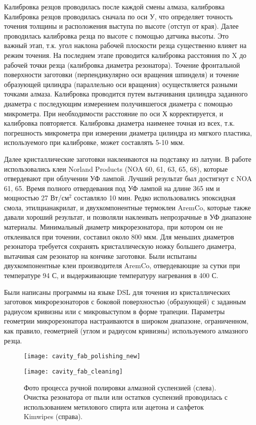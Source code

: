 Калибровка резцов проводилась после каждой смены алмаза, калибровка Калибровка резцов проводилась сначала по оси У, что определяет точность точения толщины и расположения выступа по высоте (отступ от края). Далее проводилась калибровка резца по высоте с помощью датчика высоты. Это важный этап, т.к. угол наклона рабочей плоскости резца существенно влияет на режим точения. На последнем этапе проводится калибровка расстояния по X до рабочей точки резца (калибровка диаметра резонатора). Точение фронтальной поверхности заготовки (перпендикулярно оси вращения шпинделя) и точение образующей цилиндра (параллельно оси вращения) осуществляется разными точками алмаза. Калибровка проводится путем вытачивания цилиндра заданного диаметра с последующим измерением получившегося диаметра с помощью микрометра. При необходимости расстояние по оси Х корректируется, и калибровка повторяется. Калибровка диаметра наименее точная из всех, т.к. погрешность микрометра при измерении диаметра цилиндра из мягкого пластика, используемого при калибровке, может составлять 5-10 мкм.

Далее кристаллические заготовки наклеиваются на подставку из латуни. В работе использовались клеи Norland Products (NOA 60, 61, 63, 65, 68), которые отвердевают при облучении УФ лампой. Лучший результат был достигнут с NOA 61, 65. Время полного отвердевания под УФ лампой на длине 365 нм и мощностью 27 Вт/см$^2$ составляло 10 мин. Редко использовались эпоксидная смола, этилцианакрилат, и двухкомпонентные термоклеи AremCo, которые также давали хороший результат, и позволяли наклеивать непрозрачные в УФ диапазоне материалы. Минимальный диаметр микрорезонатора, при котором он не отклеивался при точении, составил около 800 мкм. Для меньших диаметров резонатора требуется сохранять кристаллическую ножку большего диаметра, вытачивая сам резонатор на кончике заготовки. Были испытаны двухкомпонентные клеи производителя AremCo, отвердевающие за сутки при температуре 94 С, и выдерживающие температуру нагревания в 400 С.

Были написаны программы на языке DSL для точения из кристаллических заготовок микрорезонаторов с боковой поверхностью (образующей) с заданным радиусом кривизны или с микровыступом в форме трапеции. Параметры геометрии микрорезонатора настраиваются в широком диапазоне, ограниченном, как правило, геометрией (углом и радиусом кривизны) используемого алмазного резца.


\begin{figure}[ht]
  \begin{minipage}[ht]{0.49\linewidth}\centering
    \texttt{[image: cavity\_fab\_polishing\_new]}
  \end{minipage}
  \hfill
  \begin{minipage}[ht]{0.49\linewidth}\centering
    \texttt{[image: cavity\_fab\_cleaning]}
  \end{minipage}
  \caption{Фото процесса ручной полировки алмазной суспензией (слева). Очистка резонатора от пыли или остатков суспензий проводилась с использованием метилового спирта или ацетона и салфеток Kimwipes (справа).}
  \label{cavity_fab}
\end{figure}

